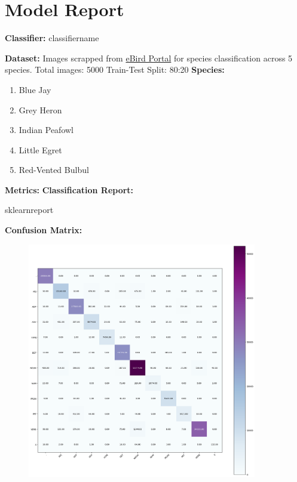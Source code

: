 \documentclass{article}
\begin{document}
\newpage
\section{Model Report}

\textbf{Classifier:} classifiername
\newline

\noindent \textbf{Dataset:}
Images scrapped from \href{https://ebird.org/explore}{eBird Portal}  for species classification across 5 species.
\newline
Total images: 5000
\newline
Train-Test Split: 80:20
\newline
\newline
\noindent \textbf{Species:}
\begin{enumerate}[noitemsep]
  \item Blue Jay
  \item Grey Heron
  \item Indian Peafowl
  \item Little Egret
  \item Red-Vented Bulbul
\end{enumerate}
\vspace{10mm}
\noindent \textbf{Metrics:}
\newline
\newline
\noindent \textbf{Classification Report:}

sklearnreport
\newline

\noindent \textbf{Confusion Matrix:}

\begin{figure}[h!]
\centering
\includegraphics[width=100mm]{images/output.jpg}
\end{figure}
\end{document}
